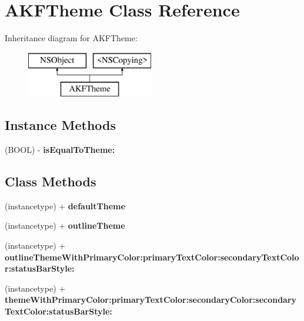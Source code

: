 \hypertarget{interface_a_k_f_theme}{}\section{A\+K\+F\+Theme Class Reference}
\label{interface_a_k_f_theme}
Inheritance diagram for A\+K\+F\+Theme\+:\begin{figure}[H]
\begin{center}
\leavevmode
\includegraphics[height=2.000000cm]{interface_a_k_f_theme}
\end{center}
\end{figure}
\subsection*{Instance Methods}
\begin{DoxyCompactItemize}
\item 
\hypertarget{interface_a_k_f_theme_a9380cb781426332ccbdc8f43de0d4d86}{}(B\+O\+O\+L) -\/ {\bfseries is\+Equal\+To\+Theme\+:}\label{interface_a_k_f_theme_a9380cb781426332ccbdc8f43de0d4d86}

\end{DoxyCompactItemize}
\subsection*{Class Methods}
\begin{DoxyCompactItemize}
\item 
\hypertarget{interface_a_k_f_theme_a061b4c6dd0f224f9ebea1da1dce29227}{}(instancetype) + {\bfseries default\+Theme}\label{interface_a_k_f_theme_a061b4c6dd0f224f9ebea1da1dce29227}

\item 
\hypertarget{interface_a_k_f_theme_ae0d13dd39779f766ff01867c44e3d4f6}{}(instancetype) + {\bfseries outline\+Theme}\label{interface_a_k_f_theme_ae0d13dd39779f766ff01867c44e3d4f6}

\item 
\hypertarget{interface_a_k_f_theme_ac6ae348d9778aed16810af4a29d7aebf}{}(instancetype) + {\bfseries outline\+Theme\+With\+Primary\+Color\+:primary\+Text\+Color\+:secondary\+Text\+Color\+:status\+Bar\+Style\+:}\label{interface_a_k_f_theme_ac6ae348d9778aed16810af4a29d7aebf}

\item 
\hypertarget{interface_a_k_f_theme_ac41e60de12b42ebcc77eb2a0881a62a4}{}(instancetype) + {\bfseries theme\+With\+Primary\+Color\+:primary\+Text\+Color\+:secondary\+Color\+:secondary\+Text\+Color\+:status\+Bar\+Style\+:}\label{interface_a_k_f_theme_ac41e60de12b42ebcc77eb2a0881a62a4}

\end{DoxyCompactItemize}
